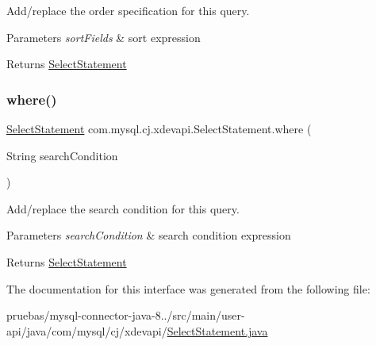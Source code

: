 Add/replace the order specification for this query.


\begin{DoxyParams}{Parameters}
{\em sort\+Fields} & sort expression \\
\hline
\end{DoxyParams}
\begin{DoxyReturn}{Returns}
\mbox{\hyperlink{interfacecom_1_1mysql_1_1cj_1_1xdevapi_1_1_select_statement}{Select\+Statement}} 
\end{DoxyReturn}
\mbox{\label{interfacecom_1_1mysql_1_1cj_1_1xdevapi_1_1_select_statement_af8a0e6c10a2091b4e6a8d6ae74e5713f}} 
\subsubsection{\texorpdfstring{where()}{where()}}
{\footnotesize\ttfamily \mbox{\hyperlink{interfacecom_1_1mysql_1_1cj_1_1xdevapi_1_1_select_statement}{Select\+Statement}} com.\+mysql.\+cj.\+xdevapi.\+Select\+Statement.\+where (\begin{DoxyParamCaption}\item[{String}]{search\+Condition }\end{DoxyParamCaption})}

Add/replace the search condition for this query.


\begin{DoxyParams}{Parameters}
{\em search\+Condition} & search condition expression \\
\hline
\end{DoxyParams}
\begin{DoxyReturn}{Returns}
\mbox{\hyperlink{interfacecom_1_1mysql_1_1cj_1_1xdevapi_1_1_select_statement}{Select\+Statement}} 
\end{DoxyReturn}


The documentation for this interface was generated from the following file\+:\begin{DoxyCompactItemize}
\item 
pruebas/mysql-\/connector-\/java-\/8../src/main/user-\/api/java/com/mysql/cj/xdevapi/\mbox{\hyperlink{_select_statement_8java}{Select\+Statement.\+java}}\end{DoxyCompactItemize}
